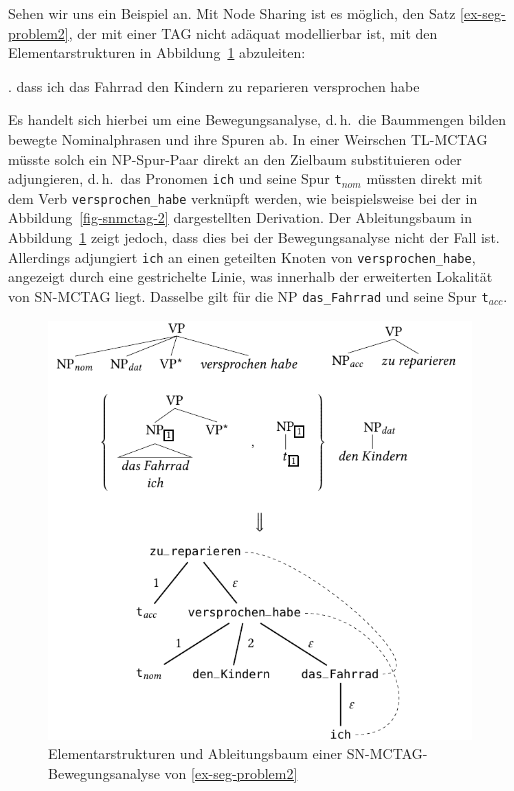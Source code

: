 Sehen wir uns ein Beispiel an. Mit Node Sharing ist es möglich, den Satz \ref{ex-seg-problem2}, der mit einer TAG nicht adäquat modellierbar ist, mit den Elementarstrukturen in Abbildung~\ref{fig-snmctag-1} abzuleiten: 

\ex. dass ich das Fahrrad den Kindern zu reparieren versprochen habe \label{ex-seg-problem2}

Es handelt sich hierbei um eine Bewegungsanalyse, d.\,h.\ die Baummengen bilden bewegte Nominalphrasen und ihre Spuren ab. In einer Weirschen TL-MCTAG müsste solch ein NP-Spur-Paar direkt an den Zielbaum substituieren oder adjungieren, d.\,h.\ das Pronomen {\tt ich} und seine Spur {\tt t}$_{nom}$ müssten direkt mit dem Verb {\tt versprochen\_habe} verknüpft werden, wie beispielsweise bei der in Abbildung~\ref{fig-snmctag-2} dargestellten Derivation. Der Ableitungsbaum in Abbildung~\ref{fig-snmctag-1} zeigt jedoch, dass dies bei der Bewegungsanalyse nicht der Fall ist. Allerdings adjungiert {\tt ich} an einen geteilten Knoten von {\tt versprochen\_habe}, angezeigt durch eine gestrichelte Linie, was innerhalb der erweiterten Lokalität von SN-MCTAG liegt. Dasselbe gilt für die NP {\tt das\_Fahrrad} und seine Spur {\tt t}$_{acc}$.     

\begin{figure}[t]
\centering
\includegraphics{graphics/abb615.pdf}
\caption{Elementarstrukturen und Ableitungsbaum einer SN-MCTAG-Bewegungs\-analyse von \ref{ex-seg-problem2}\label{fig-snmctag-1}}
\end{figure}

